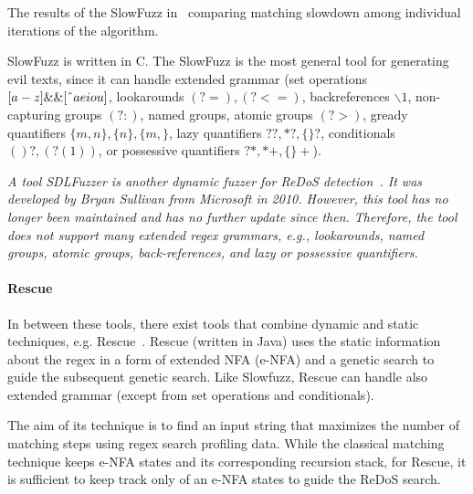 \documentclass[acmsmall,screen]{acmart}
\begin{document}
The results of the SlowFuzz in~\cite{slowfuzz} comparing matching slowdown among individual iterations of the algorithm.

%
SlowFuzz is written in C.
%
The SlowFuzz is the most general tool for generating evil texts, since it can handle extended grammar (set operations $[a-z]\&\&[\string^ aeiou]$, lookarounds $(?=), (?<=)$, backreferences $\backslash1$, non-capturing groups $(?:)$, named groups, atomic groups $(?>)$, gready quantifiers $\{m,n\}, \{n\}, \{m,\}$, lazy quantifiers $??, *?, \{\}?$, conditionals $()?, (?(1))$, or possessive quantifiers $?*, *+, \{\}+$).

\emph{
A tool SDLFuzzer is another dynamic fuzzer for ReDoS detection~\cite{}.
%
It was developed by Bryan Sullivan from Microsoft in 2010. 
%
However, this tool has no longer been maintained and has no further update
since then. 
%
Therefore, the tool does not support many extended
regex grammars, e.g., lookarounds, named groups, atomic groups,
back-references, and lazy or possessive quantifiers.
}



\paragraph{Rescue}
In between these tools, there exist tools that combine dynamic and static techniques,
e.g. Rescue~\cite{rescue}. 
%
Rescue (written in Java) uses the static information about the regex in a form of extended NFA (e-NFA)
and a genetic search to guide the subsequent genetic search. 
%
Like Slowfuzz, Rescue can handle also extended grammar (except from set operations and conditionals).


The aim of its technique is to find an input string that maximizes the
number of matching steps using regex search profiling data.
%
While the classical matching technique keeps e-NFA states and its corresponding recursion stack,
%
for Rescue, it is sufficient to keep track only of an e-NFA states to guide the ReDoS search.
\end{document}
